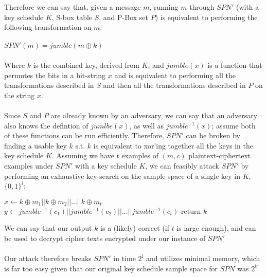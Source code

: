 \documentclass[]{article}
\begin{document}
Therefore we can say that, given a message $m$, running $m$ through $SPN'$ (with a key schedule $K$, S-box table $S$, and P-Box set $P$) is equivalent to performing the following transformation on $m$:
\\\\
	$SPN'(m) = jumble(m \oplus k)$
\\\\
Where $k$ is the combined key, derived from $K$, and $jumble(x)$ is a function that permutes the bits in a bit-string $x$ and is equivalent to performing all the transformations described in $S$ and then all the transformations described in $P$ on the string $x$. 
\\\\
Since $S$ and $P$ are already known by an adversary, we can say that an adversary also knows the defintion of $jumlbe(x)$, as well as $jumble^{-1}(x)$; assume both of these functions can be run efficiently. Therefore, $SPN'$ can be broken by finding a usable key $k$ s.t. $k$ is equivalent to xor'ing together all the keys in the key schedule $K$. Assuming we have $t$ examples of $(m, c)$ plaintext-ciphertext examples under $SPN'$ with a key schedule $K$, we can feasibly attack $SPN'$ by performing an exhaustive key-search on the sample space of a single key in $K$, $\{0,1\}^l$:
\\
\begin{algorithm}[H]
	\SetAlgoLined
	 {
		$x \leftarrow k \oplus m_1 || k \oplus m_2 || ... || k \oplus m_t$\;
		$y \leftarrow jumble^{-1}(c_1) || jumble^{-1}(c_2) || ... || jumble^{-1}(c_t)$\;
		 {
			return $k$
		}
	}
	\caption{$Attack((m_1,c_1),(m_2, c_2), ..., (m_t, c_t))$}
\end{algorithm}
We can say that our output $k$ is a (likely) correct (if $t$ is large enough), and can be used to decrypt cipher texts encrypted under our instance of $SPN'$
\\\\
Our attack therefore breaks $SPN'$ in time $2^l$ and utilizes minimal memory, which is far too easy given that our original key schedule sample space for $SPN$ was $2^{lr}$
\end{document}
